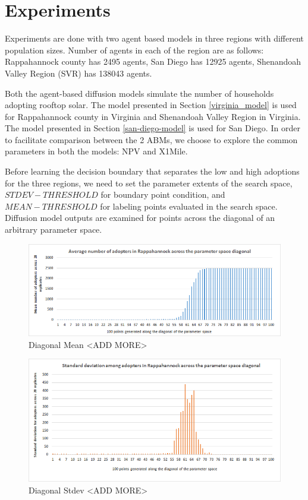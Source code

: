 \section{Experiments}

Experiments are done with two agent based models in three regions with different population sizes. Number of agents in each of the region are as follows: Rappahannock county has 2495 agents, San Diego has 12925 agents, Shenandoah Valley Region (SVR) has 138043 agents.


Both the agent-based diffusion models simulate the number of households adopting rooftop solar.
The model presented in Section \ref{virginia_model} is used for Rappahannock county in Virginia and Shenandoah Valley Region in Virginia. 
The model presented in Section \ref{san-diego-model} is used for San Diego.
In order to facilitate comparison between the 2 ABMs, we choose to explore the common parameters in both the models: NPV and X1Mile.

Before learning the decision boundary that separates the low and high adoptions for the three regions, we need to set the parameter extents of the search space, $STDEV-THRESHOLD$ for boundary point condition, and $MEAN-THRESHOLD$ for labeling points evaluated in the search space. Diffusion model outputs are examined for points across the diagonal of an arbitrary parameter space.

\begin{figure}
    \centering
    \includegraphics{AAMAS20Template-submission/figures/rapp-diag-mean1.png}
    \caption{Diagonal Mean <ADD MORE>}
    \label{fig:}
\end{figure}

\begin{figure}
    \centering
    \includegraphics{AAMAS20Template-submission/figures/rapp-diag-stdev1.png}
    \caption{Diagonal Stdev <ADD MORE>}
    \label{fig:}
\end{figure}

